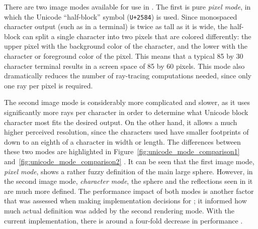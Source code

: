 There are two image modes available for use in \name.
The first is pure {\it pixel mode}, in which the Unicode ``half-block'' symbol (\texttt{U+2584}) is used.
Since monospaced character output (such as in a terminal) is twice as tall as it is wide, the half-block can split a single character into two pixels that are colored differently: the upper pixel with the background color of the character, and the lower with the character or foreground color of the pixel.
This means that a typical 85 by 30 character terminal results in a screen space of 85 by 60 pixels.
This mode also dramatically reduces the number of ray-tracing computations needed, since only one ray per pixel is required.

The second image mode is considerably more complicated and slower, as it uses significantly more rays per character in order to determine what Unicode block character most fits the desired output.
On the other hand, it allows a much higher perceived resolution, since the characters used have smaller footprints of down to an eighth of a character in width or length.
The differences between these two modes are highlighted in Figure~\ref{fig:unicode_mode_comparison1} and~\ref{fig:unicode_mode_comparison2} .
It can be seen that the first image mode, {\it pixel mode}, shows a rather fuzzy definition of the main large sphere.
However, in the second image mode, {\it character mode}, the sphere and the reflections seen in it are much more defined.
The performance impact of both modes is another factor that was assessed when making implementation decisions for \name; it informed how much actual definition was added by the second rendering mode.
With the current implementation, there is around a four-fold decrease in performance .

